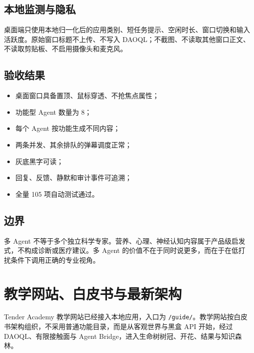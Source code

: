 \documentclass[UTF8,a4paper,11pt]{ctexart}
\begin{document}
\subsection{本地监测与隐私}

桌面端只使用本地归一化后的应用类别、短任务提示、空闲时长、窗口切换和输入活跃度。原始窗口标题不上传、不写入 DAOQL；不截图、不读取其他窗口正文、不读取剪贴板、不启用摄像头和麦克风。

\subsection{验收结果}

\begin{itemize}[leftmargin=2em]
\item 桌面窗口具备置顶、鼠标穿透、不抢焦点属性；
\item 功能型 Agent 数量为 8；
\item 每个 Agent 按功能生成不同内容；
\item 两条并发、其余排队的弹幕调度正常；
\item 灰底黑字可读；
\item 回复、反馈、静默和审计事件可追溯；
\item 全量 105 项自动测试通过。
\end{itemize}

\subsection{边界}

多 Agent 不等于多个独立科学专家。营养、心理、神经认知内容属于产品级启发式，不构成诊断或医疗建议。多 Agent 的价值不在于同时说更多，而在于在低打扰条件下调用正确的专业视角。

\section{教学网站、白皮书与最新架构}

Tender Academy 教学网站已经接入本地应用，入口为 \texttt{/guide/}。教学网站按白皮书架构组织，不采用普通功能目录，而是从客观世界与黑盒 API 开始，经过 DAOQL、有限接触面与 Agent Bridge，进入生命树树冠、开花、结果与知识森林。
\end{document}
